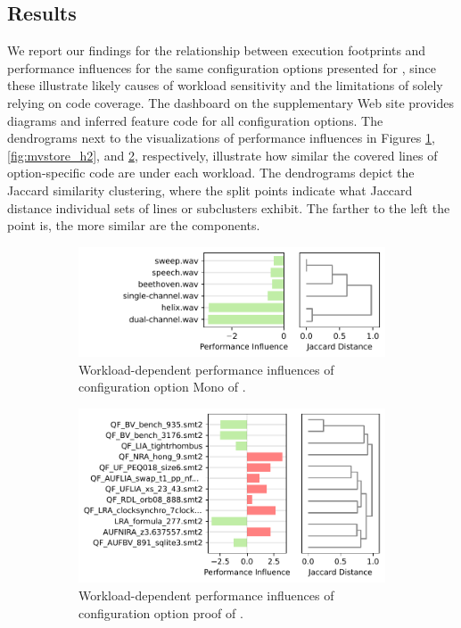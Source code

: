 {{{\subsection{Results}\label{sec:results3}
We report our findings for the relationship between execution footprints and performance influences for the same configuration options presented for , since these illustrate likely causes of workload sensitivity and the limitations of solely relying on code coverage. The dashboard on the supplementary Web site provides diagrams and inferred feature code for all configuration options. The dendrograms next to the visualizations of performance influences in Figures \ref{fig:mono_jump3r}, \ref{fig:mvstore_h2}, and \ref{fig:proof_z3}, respectively, illustrate how similar the covered lines of option-specific code are under each workload. 
The dendrograms depict the Jaccard similarity clustering, where the split points indicate what Jaccard distance individual sets of lines or subclusters exhibit. The farther to the left the point is, the more similar are the components.

\begin{figure}
	\begin{subfigure}{\linewidth}
		\hfill\includegraphics[width=0.98\linewidth]{images/jump3r.sens.pdf}
		\caption{Workload-dependent performance influences of configuration option \textsf{Mono} of \jumper.}
		\label{fig:mono_jump3r}
	\end{subfigure}
	\begin{subfigure}{\linewidth}
		\vspace{2em}
		\hfill\includegraphics[width=\linewidth]{images/z3.sens.pdf}
		\caption{Workload-dependent performance influences of configuration option \textsf{proof} of \zdrei.}
		\label{fig:proof_z3}
	\end{subfigure}
	\begin{subfigure}{\linewidth}
		

\end{subfigure}
\end{figure}}}}
